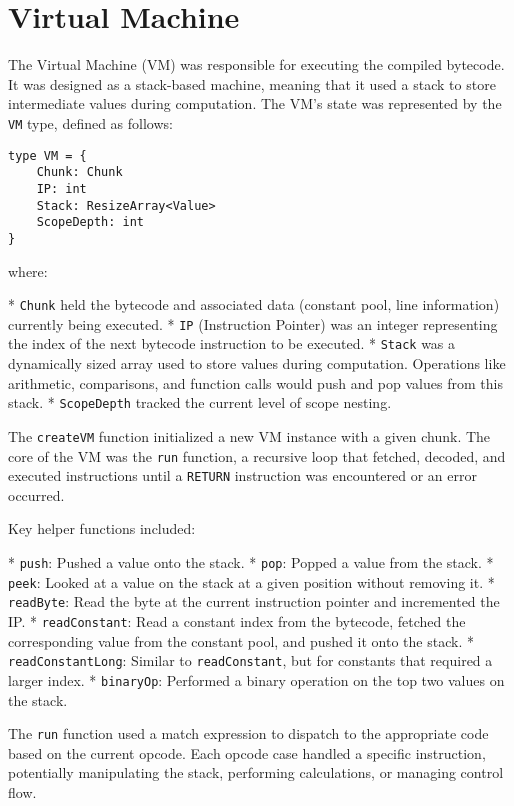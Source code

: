 \section{Virtual Machine}\label{sec:virtual-machine2}

The Virtual Machine (VM) was responsible for executing the compiled bytecode. 
It was designed as a stack-based machine, meaning that it used a stack to store intermediate values during computation. 
The VM's state was represented by the \texttt{VM} type, defined as follows:

\begin{verbatim}
type VM = {
    Chunk: Chunk
    IP: int
    Stack: ResizeArray<Value>
    ScopeDepth: int  
}
\end{verbatim}

\noindent where:

*   \texttt{Chunk} held the bytecode and associated data (constant pool, line information) currently being executed.
*   \texttt{IP} (Instruction Pointer) was an integer representing the index of the next bytecode instruction to be executed.
*   \texttt{Stack} was a dynamically sized array used to store values during computation. Operations like arithmetic, comparisons, and function calls would push and pop values from this stack.
*   \texttt{ScopeDepth} tracked the current level of scope nesting.

The \texttt{createVM} function initialized a new VM instance with a given chunk. The core of the VM was the \texttt{run} function, a recursive loop that fetched, decoded, and executed instructions until a \texttt{RETURN} instruction was encountered or an error occurred.

Key helper functions included:

*   \texttt{push}: Pushed a value onto the stack.
*   \texttt{pop}: Popped a value from the stack.
*   \texttt{peek}: Looked at a value on the stack at a given position without removing it.
*   \texttt{readByte}: Read the byte at the current instruction pointer and incremented the IP.
*   \texttt{readConstant}: Read a constant index from the bytecode, fetched the corresponding value from the constant pool, and pushed it onto the stack.
*   \texttt{readConstantLong}: Similar to \texttt{readConstant}, but for constants that required a larger index.
*   \texttt{binaryOp}: Performed a binary operation on the top two values on the stack.

The \texttt{run} function used a match expression to dispatch to the appropriate code based on the current opcode. Each opcode case handled a specific instruction, potentially manipulating the stack, performing calculations, or managing control flow.

